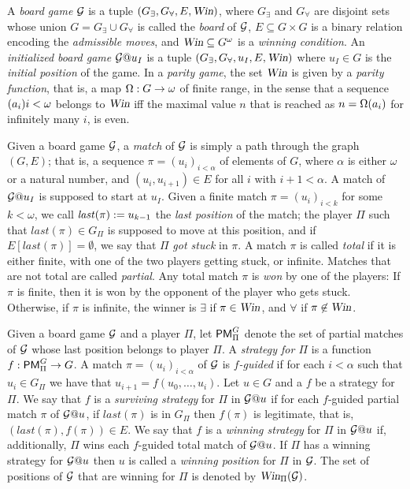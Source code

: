A \emph{board game} $\mathcal{G}$ is a tuple $(G_{\exists},G_{\forall},E,\text{\sl Win})$,
where $G_{\exists}$ and $G_{\forall}$ are disjoint sets whose union
$G=G_{\exists}\cup G_{\forall}$ is called the \emph{board} of $\mathcal{G}$,
$E\subseteq G \times G$ is a binary relation encoding the \emph{admissible
moves}, and $\text{\sl Win} \subseteq G^{\omega}$ is a \emph{winning condition}.
An \emph{initialized board game} $\mathcal{G}@u_I$ is a tuple
$(G_{\exists},G_{\forall},u_I, E,\text{\sl Win})$ where
$u_I \in G$ is the
\emph{initial position} of the game.
In a \emph{parity game}, the set $\text{\sl Win}$ is  given by a \emph{parity function},
that is, a map $\Omega: G \to \omega$ of finite range, in the sense that a
sequence $(a_{i})i<\omega$ belongs to $\text{\sl Win}$ iff the maximal value $n$ that 
is reached as $n = \Omega(a_{i})$ for infinitely many $i$, is even.

Given a board game $\mathcal{G}$, a \emph{match} of $\mathcal{G}$ is simply a path
through the graph $(G,E)$; that is, a sequence $\pi = (u_i)_{i< \alpha}$ of
elements of $G$, where $\alpha$ is either $\omega$ or a natural number,
and $(u_i,u_{i+1}) \in E$ for all $i$ with $i+1 < \alpha$.
A match of $\mathcal{G}@u_{I}$ is supposed to start at $u_{I}$.
Given a finite match $\pi = (u_i)_{i< k}$ for some $k<\omega$, we call
$\mathit{last}(\pi) \mathrel{:=} u_{k-1}$ the \emph{last position} of the match; the
player $\Pi$ such that $\mathit{last}(\pi) \in G_{\Pi}$ is supposed to move
at this position, and if $E[\mathit{last}(\pi)] = \emptyset$, we say that
$\Pi$ \emph{got stuck} in $\pi$.
%
A match $\pi$ is called \emph{total} if it is either finite, with one of the
two players getting stuck, or infinite. Matches that are not total are called
\emph{partial}.
Any total match $\pi$ is \emph{won} by one of the players:
If $\pi$ is finite, then it is won by the opponent of the player who gets stuck.
Otherwise, if $\pi$ is infinite, the winner is $\exists$ if $\pi \in
\text{\sl Win}$, and $\forall$ if $\pi \not\in \text{\sl Win}$.

Given a board game $\mathcal{G}$ and a player $\Pi$, let $\mathsf{PM}^{G}_{\Pi}$ denote
the set of partial matches of $\mathcal{G}$ whose last position belongs to player
$\Pi$.
A \emph{strategy for $\Pi$} is a function $f:\mathsf{PM}^{G}_{\Pi}\to G$.
A match $\pi  = (u_i)_{i< \alpha}$ of $\mathcal{G}$ is
\emph{$f$-guided} if for each $i < \alpha$ such that $u_i \in G_{\Pi}$ we
have that $u_{i+1} = f(u_0,\dots,u_i)$.
%
Let $u \in G$ and a $f$ be a strategy for $\Pi$.
We say that $f$ is a \emph{surviving strategy} for $\Pi$ in $\mathcal{G}@u$ if
for each $f$-guided partial match $\pi$ of $\mathcal{G}@u$, if $\mathit{last}(\pi)$
is in $G_{\Pi}$ then $f(\pi)$ is legitimate, that is, $(\mathit{last}(\pi),
f(\pi)) \in E$.
We say that $f$ is a \emph{winning strategy} for $\Pi$ in $\mathcal{G}@u$ if,
additionally, $\Pi$ wins each $f$-guided total match of $\mathcal{G}@u$.
%
If $\Pi$ has a winning strategy for $\mathcal{G}@u$ then $u$ is called a 
\emph{winning position} for $\Pi$ in $\mathcal{G}$.
The set of positions of $\mathcal{G}$ that are winning for $\Pi$ is denoted by
$\text{\sl Win}_{\Pi}(\mathcal{G})$.

